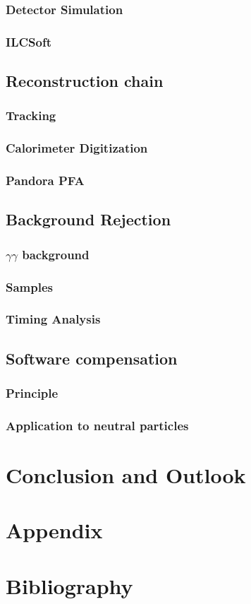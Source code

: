 \documentclass[a4paper,12pt]{report}
\begin{document}
\subsection{Detector Simulation}
\subsection{ILCSoft}
\section{Reconstruction chain}
\subsection{Tracking}
\subsection{Calorimeter Digitization}
\subsection{Pandora PFA}
\section{Background Rejection}
\subsection{$\gamma\gamma$ background}
\subsection{Samples}
\subsection{Timing Analysis}
\section{Software compensation}
\subsection{Principle}
\subsection{Application to neutral particles}

\newpage

\chapter{Conclusion and Outlook}

\newpage

\chapter{Appendix}

\newpage

\chapter{Bibliography}
\end{document}
